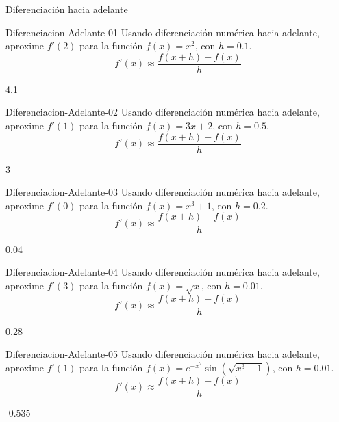 \documentclass[a4,11pt]{aleph-notas}
\begin{document}
\begin{quiz}{Diferenciación hacia adelante}
\begin{numerical}[tolerance=0.01]%
    {Diferenciacion-Adelante-01}
    Usando diferenciación numérica hacia adelante, aproxime \( f'(2) \) para la función \( f(x)=x^2 \), con \( h=0.1 \).
    \[
        f'(x)\approx \frac{f(x+h)-f(x)}{h}
    \]
    \item 4.1
\end{numerical}

\begin{numerical}[tolerance=0.01]%
    {Diferenciacion-Adelante-02}
    Usando diferenciación numérica hacia adelante, aproxime \( f'(1) \) para la función \( f(x)=3x+2 \), con \( h=0.5 \).
    \[
        f'(x)\approx \frac{f(x+h)-f(x)}{h}
    \]
    \item 3
\end{numerical}

\begin{numerical}[tolerance=0.01]%
    {Diferenciacion-Adelante-03}
    Usando diferenciación numérica hacia adelante, aproxime \( f'(0) \) para la función \( f(x)=x^3+1 \), con \( h=0.2 \).
    \[
        f'(x)\approx \frac{f(x+h)-f(x)}{h}
    \]
    \item 0.04
\end{numerical}

\begin{numerical}[tolerance=0.01]%
    {Diferenciacion-Adelante-04}
    Usando diferenciación numérica hacia adelante, aproxime \( f'(3) \) para la función \( f(x)=\sqrt{x} \), con \( h=0.01 \).
    \[
        f'(x)\approx \frac{f(x+h)-f(x)}{h}
    \]
    \item 0.28
\end{numerical}

\begin{numerical}[tolerance=0.01]%
    {Diferenciacion-Adelante-05}
    Usando diferenciación numérica hacia adelante, aproxime \( f'(1) \) para la función \( f(x)=e^{-x^2}\sin\left(\sqrt{x^3+1}\right) \), con \( h=0.01 \).
    \[
        f'(x)\approx \frac{f(x+h)-f(x)}{h}
    \]
    \item -0.535
\end{numerical}

\end{quiz}
\end{document}

